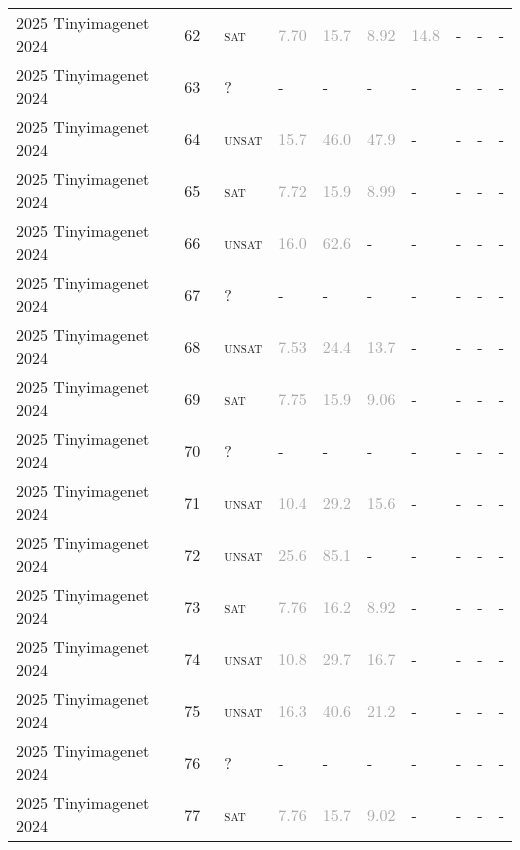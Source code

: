 \begin{center}
{\begin{longtable}{@{}llllllllll@{}}
2025 Tinyimagenet 2024 & 62 & ~\textsc{sat} & \textcolor{darkgray}{7.70} & \textcolor{darkgray}{15.7} & \textcolor{darkgray}{8.92} & \textcolor{darkgray}{14.8} & - & - & - \\
2025 Tinyimagenet 2024 & 63 & ~? & - & - & - & - & - & - & - \\
2025 Tinyimagenet 2024 & 64 & ~\textsc{unsat} & \textcolor{darkgray}{15.7} & \textcolor{darkgray}{46.0} & \textcolor{darkgray}{47.9} & - & - & - & - \\
2025 Tinyimagenet 2024 & 65 & ~\textsc{sat} & \textcolor{darkgray}{7.72} & \textcolor{darkgray}{15.9} & \textcolor{darkgray}{8.99} & - & - & - & - \\
2025 Tinyimagenet 2024 & 66 & ~\textsc{unsat} & \textcolor{darkgray}{16.0} & \textcolor{darkgray}{62.6} & - & - & - & - & - \\
2025 Tinyimagenet 2024 & 67 & ~? & - & - & - & - & - & - & - \\
2025 Tinyimagenet 2024 & 68 & ~\textsc{unsat} & \textcolor{darkgray}{7.53} & \textcolor{darkgray}{24.4} & \textcolor{darkgray}{13.7} & - & - & - & - \\
2025 Tinyimagenet 2024 & 69 & ~\textsc{sat} & \textcolor{darkgray}{7.75} & \textcolor{darkgray}{15.9} & \textcolor{darkgray}{9.06} & - & - & - & - \\
2025 Tinyimagenet 2024 & 70 & ~? & - & - & - & - & - & - & - \\
2025 Tinyimagenet 2024 & 71 & ~\textsc{unsat} & \textcolor{darkgray}{10.4} & \textcolor{darkgray}{29.2} & \textcolor{darkgray}{15.6} & - & - & - & - \\
2025 Tinyimagenet 2024 & 72 & ~\textsc{unsat} & \textcolor{darkgray}{25.6} & \textcolor{darkgray}{85.1} & - & - & - & - & - \\
2025 Tinyimagenet 2024 & 73 & ~\textsc{sat} & \textcolor{darkgray}{7.76} & \textcolor{darkgray}{16.2} & \textcolor{darkgray}{8.92} & - & - & - & - \\
2025 Tinyimagenet 2024 & 74 & ~\textsc{unsat} & \textcolor{darkgray}{10.8} & \textcolor{darkgray}{29.7} & \textcolor{darkgray}{16.7} & - & - & - & - \\
2025 Tinyimagenet 2024 & 75 & ~\textsc{unsat} & \textcolor{darkgray}{16.3} & \textcolor{darkgray}{40.6} & \textcolor{darkgray}{21.2} & - & - & - & - \\
2025 Tinyimagenet 2024 & 76 & ~? & - & - & - & - & - & - & - \\
2025 Tinyimagenet 2024 & 77 & ~\textsc{sat} & \textcolor{darkgray}{7.76} & \textcolor{darkgray}{15.7} & \textcolor{darkgray}{9.02} & - & - & - & - \\

\end{longtable}}
\end{center}
